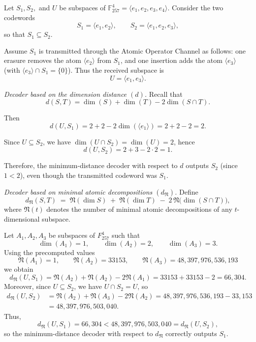 \documentclass{svproc}
\begin{document}
\begin{example}

Let $S_1, S_2,$ and $U$ be subspaces of $\mathbb{F}_{257}^4 = \langle e_1,e_2,e_3,e_4 \rangle$.
Consider the two codewords
\[
S_1 = \langle e_1, e_2 \rangle, \qquad
S_2 = \langle e_1, e_2, e_3 \rangle,
\]
so that $S_1 \subseteq S_2$.

Assume $S_1$ is transmitted through the Atomic Operator Channel as follows: one erasure removes the atom $\langle e_2 \rangle$ from $S_1$, and one insertion adds the atom $\langle e_3 \rangle$ (with $\langle e_3 \rangle \cap S_1 = \{0\}$). Thus the received subspace is
\[
U = \langle e_1, e_3 \rangle.
\]

\emph{Decoder based on the dimension distance $(d)$.}
Recall that
\[
d(S,T) = \dim(S) + \dim(T) - 2\dim(S \cap T).
\]

Then
\[
d(U,S_1) = 2 + 2 - 2\dim(\langle e_1 \rangle) = 2 + 2 - 2 = 2.
\]

Since $U \subseteq S_2$, we have $\dim(U \cap S_2) = \dim(U) = 2$, hence
\[
d(U,S_2) = 2 + 3 - 2 \cdot 2 = 1.
\]

Therefore, the minimum-distance decoder with respect to $d$ outputs $S_2$ (since $1 < 2$), even though the transmitted codeword was $S_1$.

\emph{Decoder based on minimal atomic decompositions $(d_{\mathfrak N})$.}
Define
\[
d_{\mathfrak N}(S,T)\;=\;\mathfrak N(\dim S)\;+\;\mathfrak N(\dim T)\;-\;2\,\mathfrak N\!\bigl(\dim(S\cap T)\bigr),
\]
where $\mathfrak N(t)$ denotes the number of minimal atomic decompositions of any $t$-dimensional subspace.

Let $A_1,A_2,A_3$ be subspaces of ${F}_{257}^4$ such that
\[
\dim(A_1)=1,\qquad \dim(A_2)=2,\qquad \dim(A_3)=3.
\]
Using the precomputed values
\[
\mathfrak N(A_1)=1,\qquad
\mathfrak N(A_2)=33153,\qquad
\mathfrak N(A_3)= 48,397,976,536,193
\]
we obtain
\[
d_{\mathfrak N}(U,S_1)
=\mathfrak N(A_2)+\mathfrak N(A_2)-2\mathfrak N(A_1)
=33153+33153-2
=66{,}304.
\]
Moreover, since $U\subseteq S_2$, we have $U\cap S_2=U$, so
\begin{align*}
d_{\mathfrak N}(U,S_2)
&=\mathfrak N(A_2)+\mathfrak N(A_3)-2\mathfrak N(A_2)
=48,397,976,536,193-33{,}153\\
&=48,397,976,503,040.
\end{align*}
Thus,
\[
d_{\mathfrak N}(U,S_1)=66{,}304<48,397,976,503,040=d_{\mathfrak N}(U,S_2),
\]
so the minimum-distance decoder with respect to $d_{\mathfrak N}$ correctly outputs $S_1$.
\end{example}
\end{document}
